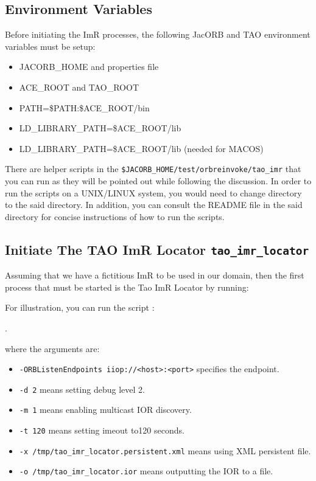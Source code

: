 \subsection{Environment Variables}

Before initiating the ImR processes, the following JacORB and TAO
environment variables must be setup:
\begin{itemize}
   \item JACORB\_HOME and properties file
   \item ACE\_ROOT and TAO\_ROOT
   \item PATH=\$PATH:\$ACE\_ROOT/bin
   \item LD\_LIBRARY\_PATH=\$ACE\_ROOT/lib
   \item LD\_LIBRARY\_PATH=\$ACE\_ROOT/lib (needed for MACOS)
\end{itemize}

There are helper scripts in the {\tt \$JACORB\_HOME/test/orbreinvoke/tao\_imr}
 that you can run as they will be pointed out while following the discussion.
In order to run the scripts on a UNIX/LINUX system, you would need to
change directory to the said directory.  In addition, you can consult the
README file in the said directory for concise instructions of how to
run the scripts.

\subsection{Initiate The TAO ImR Locator {\tt tao\_imr\_locator}}

Assuming that we have a fictitious ImR to be used in our domain, then
the first process that must be started is the Tao ImR Locator by running:


For illustration, you can  run the script :

.

where the arguments are:
\begin{itemize}
    \item {\tt -ORBListenEndpoints iiop://<host>:<port>} specifies the endpoint.
    \item {\tt -d 2} means setting debug level 2.
    \item {\tt -m 1} means enabling multicast IOR discovery.
    \item {\tt -t 120} means setting imeout to120 seconds.
    \item {\tt -x /tmp/tao\_imr\_locator.persistent.xml} means using XML persistent file.
    \item {\tt -o /tmp/tao\_imr\_locator.ior} means outputting the IOR to a file.
\end{itemize}

